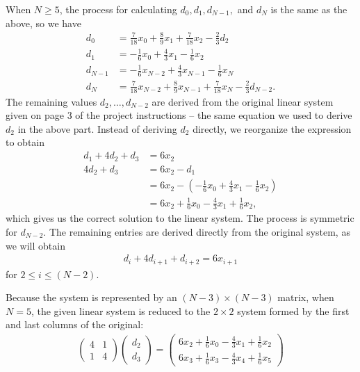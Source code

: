 \documentclass[paper=a4, fontsize=11pt]{scrartcl} %
\begin{document}
When $N \geq 5$, the process for calculating $d_0, d_1, d_{N-1},$ and $d_N$ is the same as the above, so we have
\begin{align*}
    d_0 &=
    \frac{7}{18}x_0 +\frac{8}{9}x_1 +\frac{7}{18}x_2 -\frac{2}{3}d_2\\
    d_1 &=
    -\frac{1}{6}x_0 + \frac{4}{3}x_1 - \frac{1}{6}x_2 \\
    d_{N-1} &=
    -\frac{1}{6}x_{N-2} + \frac{4}{3}x_{N-1} - \frac{1}{6}x_N \\
    d_N &=
    \frac{7}{18}x_{N-2} +\frac{8}{9}x_{N-1} +\frac{7}{18}x_N -\frac{2}     {3}d_{N-2}.
\end{align*}
The remaining values $d_2, \dots, d_{N-2}$ are derived from the original linear
system given on page $3$ of the project instructions -- the same equation we
used to derive $d_2$ in the above part. Instead of deriving $d_2$ directly, we
reorganize the expression to obtain
\begin{align*}
    d_1 + 4d_2 + d_3 &=
    6x_2 \\
    4d_2 + d_3 &=
    6x_2 - d_1 \\
    &=
    6x_2 - (-\frac{1}{6}x_0 + \frac{4}{3}x_1 - \frac{1}{6}x_2) \\
    &=
    6x_2 + \frac{1}{6}x_0 - \frac{4}{3}x_1 + \frac{1}{6}x_2,
\end{align*}
which gives us the correct solution to the linear system. The process is
symmetric for $d_{N-2}$. The remaining entries are derived directly from the
original system, as we will obtain
\begin{align*}
    d_i + 4d_{i+1} + d_{i+2} = 6x_{i+1}
\end{align*}
for $2 \leq i \leq (N-2)$.

Because the system is represented by an $(N-3) \times (N-3)$ matrix, when
$N=5$, the given linear system is reduced to the $2 \times 2$ system formed by
the first and last columns of the original:
\begin{align*}
    \begin{pmatrix}
        4 & 1 \\
        1 & 4
    \end{pmatrix}
    \begin{pmatrix}
        d_2 \\
        d_3
    \end{pmatrix}
    =
    \begin{pmatrix}
        6x_2 + \frac{1}{6}x_0 - \frac{4}{3}x_1 + \frac{1}{6}x_2 \\
        6x_3 + \frac{1}{6}x_3 - \frac{4}{3}x_4 + \frac{1}{6}x_5
    \end{pmatrix}
\end{align*}
\end{document}

